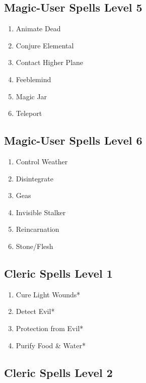\subsection{Magic-User Spells Level 5}\label{magic-user-spells-level-5}

\begin{enumerate}
\def\labelenumi{\arabic{enumi}.}
\tightlist
\item
  Animate Dead
\item
  Conjure Elemental
\item
  Contact Higher Plane
\item
  Feeblemind
\item
  Magic Jar
\item
  Teleport
\end{enumerate}

\subsection{Magic-User Spells Level 6}\label{magic-user-spells-level-6}

\begin{enumerate}
\def\labelenumi{\arabic{enumi}.}
\tightlist
\item
  Control Weather
\item
  Disintegrate
\item
  Geas
\item
  Invisible Stalker
\item
  Reincarnation
\item
  Stone/Flesh
\end{enumerate}

\subsection{Cleric Spells Level 1}\label{cleric-spells-level-1}

\begin{enumerate}
\def\labelenumi{\arabic{enumi}.}
\tightlist
\item
  Cure Light Wounds*
\item
  Detect Evil*
\item
  Protection from Evil*
\item
  Purify Food \& Water*
\end{enumerate}

\subsection{Cleric Spells Level 2}\label{cleric-spells-level-2}

